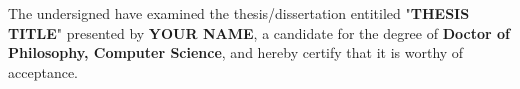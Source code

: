 
\thispagestyle{empty}

\noindent
The undersigned have examined the thesis/dissertation entitiled "\textbf{THESIS TITLE}" presented by \textbf{YOUR NAME}, a candidate for the degree of \textbf{Doctor of Philosophy, Computer Science}, and hereby certify that it is worthy of acceptance.

\vspace{1.75cm}

\noindent\makebox[2in][l]{\hrulefill} \hfill\makebox[3in]{\hrulefill}
 \hfill{}
\par\hfill{}

\vspace{1.5cm}

\hfill\makebox[3in]{\hrulefill}
\par\hfill{}
\par\hfill{}

\vspace{1.5cm}

\hfill\makebox[3in]{\hrulefill}
\par\hfill{}
\par\hfill{}

\vspace{1.5cm}

\hfill\makebox[3in]{\hrulefill}
\par\hfill{}
\par\hfill{}

\clearpage